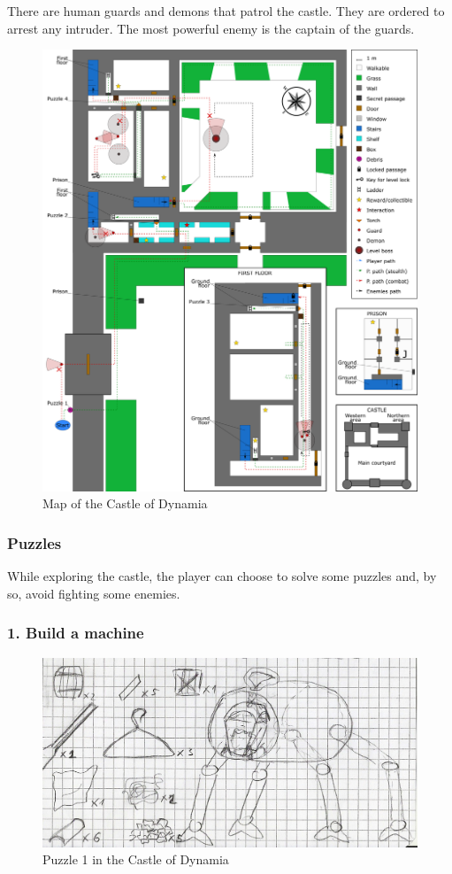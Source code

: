 There are human guards and demons that patrol the castle. They are ordered to arrest any intruder. The most powerful enemy is the captain of the guards.

\begin{figure}[H]
  \centering
  \includegraphics[width=\textwidth]{Images/Maps/castleOfDynamia}
  \caption{Map of the Castle of Dynamia}
\end{figure}

\subsubsection{Puzzles}
While exploring the castle, the player can choose to solve some puzzles and, by so, avoid fighting some enemies.

\subsubsection*{1. Build a machine}

\begin{figure}[H]
  \centering
  \includegraphics[width=\textwidth]{Images/Puzzles/castleOfDynamia_1}
  \caption{Puzzle 1 in the Castle of Dynamia}
\end{figure}

